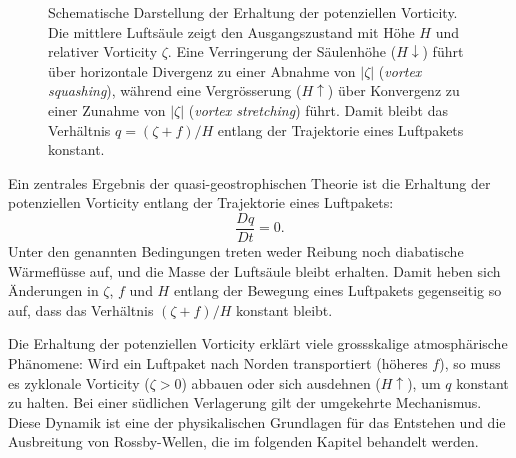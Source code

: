 \begin{figure}


	\caption{%
		Schematische Darstellung der Erhaltung der potenziellen Vorticity.
		Die mittlere Luftsäule zeigt den Ausgangszustand mit Höhe $H$ und relativer
		Vorticity $\zeta$. Eine Verringerung der Säulenhöhe ($H \downarrow$) führt
		über horizontale Divergenz zu einer Abnahme von $|\zeta|$
		(\emph{vortex squashing}), während eine Vergrösserung ($H \uparrow$) über
		Konvergenz zu einer Zunahme von $|\zeta|$ (\emph{vortex stretching}) führt.
		Damit bleibt das Verhältnis $q=(\zeta+f)/H$ entlang der Trajektorie eines
		Luftpakets konstant.%
	}
	\label{fig:pv_conservation}
\end{figure}

Ein zentrales Ergebnis der quasi-geostrophischen Theorie ist die Erhaltung der
potenziellen Vorticity entlang der Trajektorie eines Luftpakets:
\begin{equation}
	\frac{Dq}{Dt} = 0.
	\label{rossby:eq:pv_conservation}
\end{equation}
Unter den genannten Bedingungen treten weder Reibung noch diabatische Wärmeflüsse auf, und die Masse der Luftsäule bleibt erhalten.
Damit heben sich Änderungen in \(\zeta\), \(f\) und \(H\) entlang der Bewegung eines Luftpakets gegenseitig so auf, dass das Verhältnis \((\zeta + f)/H\) konstant bleibt.

Die Erhaltung der potenziellen Vorticity erklärt viele grossskalige atmosphärische Phänomene: Wird ein Luftpaket nach Norden transportiert (höheres \(f\)), so muss es zyklonale
Vorticity (\(\zeta > 0\)) abbauen oder sich ausdehnen (\(H \uparrow\)), um
\(q\) konstant zu halten. Bei einer südlichen Verlagerung gilt der umgekehrte
Mechanismus. Diese Dynamik ist eine der physikalischen Grundlagen für das
Entstehen und die Ausbreitung von Rossby-Wellen, die im folgenden Kapitel
behandelt werden.
